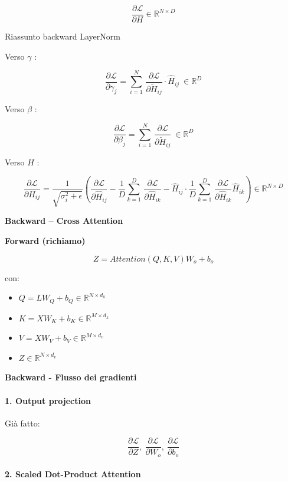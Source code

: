 \documentclass[
  11pt,
]{article}
\begin{document}
\[\frac{\partial\mathcal{L}}{\partial H} \in \mathbb{R}^{N \times D}\]

Riassunto backward LayerNorm

Verso \(\gamma\) :

\[\frac{\partial\mathcal{L}}{\partial\gamma_{j}} = \sum_{i = 1}^{N}\,\frac{\partial\mathcal{L}}{\partial{\widetilde{H}}_{ij}} \cdot {\widehat{H}}_{ij}\  \in \mathbb{R}^{D}\]

Verso \(\beta\) :

\[\frac{\partial\mathcal{L}}{\partial\beta_{j}} = \sum_{i = 1}^{N}\,\frac{\partial\mathcal{L}}{\partial{\widetilde{H}}_{ij}}\  \in \mathbb{R}^{D}\]

Verso \(H\) :

\[\frac{\partial\mathcal{L}}{\partial H_{ij}} = \frac{1}{\sqrt{\sigma_{i}^{2} + \epsilon}}\left( \frac{\partial\mathcal{L}}{\partial{\widehat{H}}_{ij}} - \frac{1}{D}\sum_{k = 1}^{D}\,\frac{\partial\mathcal{L}}{\partial{\widehat{H}}_{ik}} - {\widehat{H}}_{ij} \cdot \frac{1}{D}\sum_{k = 1}^{D}\,\frac{\partial\mathcal{L}}{\partial{\widehat{H}}_{ik}}{\widehat{H}}_{ik} \right) \in \mathbb{R}^{N \times D}\]

\textbf{Backward -- Cross Attention}

\textbf{Forward (richiamo)}

\[Z = Attention(Q,K,V)W_{o} + b_{o}\]

con:

\begin{itemize}
\item
  \(Q = LW_{Q} + b_{Q} \in \mathbb{R}^{N \times d_{k}}\)
\item
  \(K = XW_{K} + b_{K} \in \mathbb{R}^{M \times d_{k}}\)
\item
  \(V = XW_{V} + b_{V} \in \mathbb{R}^{M \times d_{v}}\)
\item
  \(Z \in \mathbb{R}^{N \times d_{v}}\)
\end{itemize}

\textbf{Backward - Flusso dei gradienti}

\paragraph{1. Output projection}

Già fatto:

\[\frac{\partial\mathcal{L}}{\partial Z},\ \frac{\partial\mathcal{L}}{\partial W_{o}},\ \frac{\partial\mathcal{L}}{\partial b_{o}}\]

\paragraph{2. Scaled Dot-Product Attention}
\end{document}
